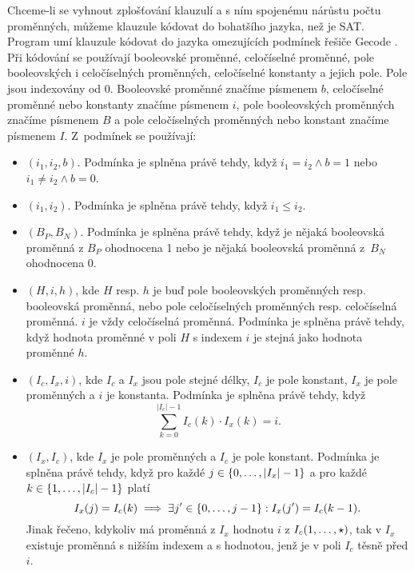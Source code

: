 {
\def\LowerEq{\textproc{Lower-Eq}}
\def\Clause{\textproc{Clause}}
\def\Precede{\textproc{Precede}}

Chceme-li se vyhnout zplošťování klauzulí a s ním spojenému nárůstu počtu
proměnných, můžeme klauzule kódovat do bohatšího jazyka, než je SAT.
Program \crossbow{} umí klauzule kódovat do jazyka
omezujících podmínek řešiče Gecode \cite{gecode}.
Při kódování se používají booleovské proměnné, celočíselné proměnné,
pole booleovských i celočíselných proměnných, celočíselné konstanty
a jejich pole. Pole jsou indexovány od 0.
Booleovské proměnné značíme písmenem
$b$, celočíselné proměnné nebo konstanty značíme písmenem $i$,
pole booleovských proměnných značíme písmenem $B$
a pole celočíselných proměnných nebo konstant značíme písmenem $I$.
Z~podmínek se používají:
\begin{itemize}
\item \Eq$(i_1, i_2, b)$. Podmínka je splněna právě tehdy,
  když $i_1 = i_2 \wedge b = 1$ nebo $i_1 \neq i_2 \wedge b = 0$.
\item \LowerEq$(i_1, i_2)$. Podmínka je splněna právě tehdy,
  když $i_1 \le i_2$.
\item \Clause$(B_P, B_N)$. Podmínka je splněna právě tehdy,
  když je nějaká booleovská proměnná z $B_P$ ohodnocena 1
  nebo je nějaká booleovská proměnná z~$B_N$ ohodnocena 0.
\item \Element$(H, i, h)$, kde $H$ resp. $h$ je buď pole booleovských
  proměnných resp. booleovská proměnná, nebo pole celočíselných proměnných
  resp. celo\-číselná proměnná. $i$ je vždy celočíselná proměnná.
  Podmínka je splněna právě tehdy,
  když hodnota proměnné v poli $H$ s indexem $i$ je stejná jako
  hodnota proměnné $h$.
\item \Linear$(I_c, I_x, i)$, kde $I_c$ a $I_x$ jsou pole stejné délky,
  $I_c$ je pole konstant, $I_x$ je pole proměnných a $i$ je konstanta.
  Podmínka je splněna právě tehdy, když
  \[
    \sum^{|I_c|-1}_{k=0} I_c(k) \cdot I_x(k) = i.
  \]
\item \Precede$(I_x, I_c)$, kde $I_x$ je pole proměnných a
  $I_c$ je pole konstant. Podmínka je splněna právě tehdy, když
  pro každé $j \in \{ 0 , \ldots, |I_x| - 1 \}$ a pro každé
  $k \in \{ 1 , \ldots, |I_c| - 1 \}$ platí
  \[
    I_x(j) = I_c(k) \implies
      \exists j' \in \{ 0 , \ldots, j - 1 \}: I_x(j') = I_c(k - 1).
  \]
  Jinak řečeno, kdykoliv má proměnná z $I_x$ hodnotu $i$
  z $I_c(1 , \ldots, \star)$, tak v $I_x$ existuje proměnná
  s nižším indexem a s hodnotou, jenž je v poli $I_c$ těsně před $i$.
\end{itemize}

}
